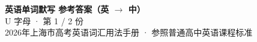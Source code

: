 \documentclass[10pt,a4paper]{article}
\begin{document}
\pagestyle{plain}

\begin{center}
{\LARGE\bfseries 英语单词默写 \quad 参考答案（英 $\to$ 中）}\\[0.22em]
{\large U 字母 · 第 1 / 2 份}\\[0.18em]
{\small 2026年上海市高考英语词汇用法手册 · 参照普通高中英语课程标准}
\end{center}

\vspace{0.2em}
\noindent{\color{rulegray}\rule{\textwidth}{0.8pt}}

\vspace{0.35em}

\vspace{0.25em}
\renewcommand{\arraystretch}{1.32}
\end{document}
